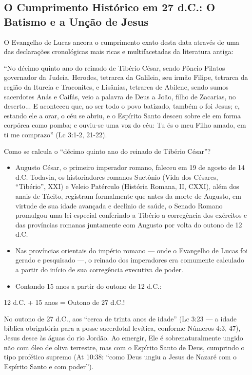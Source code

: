 \documentclass[11pt,a4paper,openany]{book}
\begin{document}
\subsection{O Cumprimento Histórico em 27 d.C.: O Batismo e a Unção de Jesus}


O Evangelho de Lucas ancora o cumprimento exato desta data através de uma das declarações cronológicas mais ricas e multifacetadas da literatura antiga:

``No décimo quinto ano do reinado de Tibério César, sendo Pôncio Pilatos governador da Judeia, Herodes, tetrarca da Galileia, seu irmão Filipe, tetrarca da região da Itureia e Traconites, e Lisânias, tetrarca de Abilene, sendo sumos sacerdotes Anás e Caifás, veio a palavra de Deus a João, filho de Zacarias, no deserto... E aconteceu que, ao ser todo o povo batizado, também o foi Jesus; e, estando ele a orar, o céu se abriu, e o Espírito Santo desceu sobre ele em forma corpórea como pomba; e ouviu-se uma voz do céu: Tu és o meu Filho amado, em ti me comprazo'' (Lc 3:1-2, 21-22).

Como se calcula o ``décimo quinto ano do reinado de Tibério César''?
\begin{itemize}
  \item Augusto César, o primeiro imperador romano, faleceu em 19 de agosto de 14 d.C. Todavia, os historiadores romanos Suetônio (Vida dos Césares, ``Tibério'', XXI) e Veleio Patérculo (História Romana, II, CXXI), além dos anais de Tácito, registram formalmente que antes da morte de Augusto, em virtude de sua idade avançada e declínio de saúde, o Senado Romano promulgou uma lei especial conferindo a Tibério a corregência dos exércitos e das províncias romanas juntamente com Augusto por volta do outono de 12 d.C.
  \item Nas províncias orientais do império romano — onde o Evangelho de Lucas foi gerado e pesquisado —, o reinado dos imperadores era comumente calculado a partir do início de sua corregência executiva de poder.
  \item Contando 15 anos a partir do outono de 12 d.C.:
\end{itemize}

12 d.C. + 15 anos = Outono de 27 d.C.!

No outono de 27 d.C., aos ``cerca de trinta anos de idade'' (Lc 3:23 — a idade bíblica obrigatória para a posse sacerdotal levítica, conforme Números 4:3, 47), Jesus desce às águas do rio Jordão. Ao emergir, Ele é sobrenaturalmente ungido não com óleo de oliva terrestre, mas com o Espírito Santo de Deus, cumprindo o tipo profético supremo (At 10:38: ``como Deus ungiu a Jesus de Nazaré com o Espírito Santo e com poder'').
\end{document}
